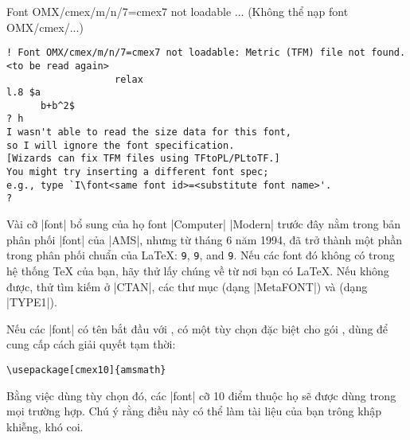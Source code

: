 \begin{error}{Font OMX/cmex/m/n/7=cmex7 not loadable ...}
(Không thể nạp font OMX/cmex/...)
\errexa
\begin{verbatim}
! Font OMX/cmex/m/n/7=cmex7 not loadable: Metric (TFM) file not found.
<to be read again>
                   relax
l.8 $a
      b+b^2$
? h
I wasn't able to read the size data for this font,
so I will ignore the font specification.
[Wizards can fix TFM files using TFtoPL/PLtoTF.]
You might try inserting a different font spec;
e.g., type `I\font<same font id>=<substitute font name>'.
?
\end{verbatim}
\errexpl
Vài cỡ |font| bổ sung của họ font |Computer| |Modern| trước đây nằm trong
bản phân phối |font| của |AMS|, nhưng từ tháng 6 năm 1994, đã trở thành
một phần trong phân phối chuẩn của \LaTeX{}:
\ndash \texttt{9}, \ndash \texttt{9}, and
\ndash \texttt{9}.
Nếu các font đó không có trong hệ thống \TeX{} của bạn, hãy thử lấy chúng
về từ nơi bạn có \LaTeX{}. Nếu không được, thử tìm kiếm ở |CTAN|, các thư mục
 (dạng |MetaFONT|) và
 (dạng |TYPE1|).

\medskip
Nếu các |font| có tên bắt đầu với , có một tùy chọn đặc biệt
 cho gói , dùng để cung cấp cách giải quyết tạm thời:
\begin{verbatim}
\usepackage[cmex10]{amsmath}
\end{verbatim}
Bằng việc dùng tùy chọn đó, các |font| cỡ 10 điểm thuộc họ 
sẽ được dùng trong mọi trường hợp. Chú ý rằng điều này có thể làm tài
liệu của bạn trông khập khiễng, khó coi.
\end{error}

